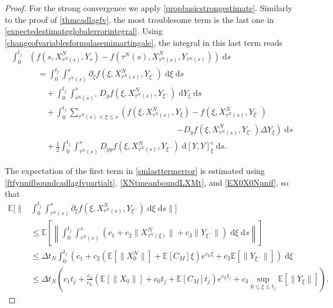 \documentclass[reqno,12pt]{amsart}
\theoremstyle{plain} %
\theoremstyle{definition} %
\begin{document}
\begin{proof}
    For the strong convergence we apply \cref{propbasicstrongestimate}. Similarly to the proof of \cref{thmcadlagfv}, the most troublesome term is the last one in \eqref{expectedestimateglobalerrorintegral}. Using \eqref{changeofvariablesformulasemimartingale}, the integral in this last term reads
    \begin{equation}
        \label{smlasttermerror}
        \begin{aligned}
            \int_0^{t_j} & \left( f(s, X_{\tau^N(s)}^N, Y_s) - f(\tau^N(s), X_{\tau^N(s)}^N, Y_{\tau^N(s)}) \right)\;\mathrm{d}s \\
            & \quad = \int_0^{t_j} \int_{\tau^N(s)}^s \partial_\xi f(\xi, X_{\tau^N(s)}^N, Y_{\xi^-})\;\mathrm{d}\xi \;\mathrm{d}s \\
            & \qquad + \int_0^{t_j} \int_{\tau^N(s)^+}^s D_y f(\xi, X_{\tau^N(s)}^N, Y_{\xi^-}) \;\mathrm{d}Y_\xi \;\mathrm{d}s \\
            & \qquad + \int_0^{t_j} \sum_{\tau^N(s) < \xi \leq s} \left(f(\xi, X_{\tau^N(s)}^N, Y_\xi) - f(\xi, X_{\tau^N(s)}^N, Y_{\xi^{-}}) \right. \\
            & \hspace{3in} \left. - D_y f(\xi, X_{\tau^N(s)}^N, Y_{\xi^-})\Delta Y_\xi\right) \;\mathrm{d}s \\ 
            & \qquad + \frac{1}{2} \int_0^{t_j} \int_{\tau^N(s)}^s D_{yy}f(\xi, X_{\tau^N(s)}^N, Y_{\xi^-})\;\mathrm{d}[Y, Y]_\xi^c\;\mathrm{d}s.
        \end{aligned}
    \end{equation}
    
    The expectation of the first term in \eqref{smlasttermerror} is estimated using \eqref{ftfyunifboundcadlagfvpartialt}, \eqref{XNtmeanboundLXMt}, and \eqref{EX0X0Nunif}, so that
    \begin{align*}
        \mathbb{E}\bigg[\bigg\| & \int_0^{t_j} \int_{\tau^N(s)}^s \partial_\xi f(\xi, X_{\tau^N(s)}^N, Y_{\xi^-})\;\mathrm{d}\xi\;\mathrm{d}s\bigg\|\bigg] \\
        & \leq \mathbb{E}\left[\left\|\int_0^{t_j} \int_{\tau^N(s)}^s \left(c_1 + c_2 \|X_{\tau^N(\xi)}^N\| + c_3\|Y_{\xi^-}\|\right)\;\mathrm{d}\xi\;\mathrm{d}s\right\|\right] \\
        & \leq \Delta t_N\int_0^{t_j} \left(c_1 + c_2  \left(\mathbb{E}\left[\|X_0^N\|\right] + \mathbb{E}[C_M] \xi \right)e^{c_L \xi} + c_3\mathbb{E}\left[\|Y_{\xi^-}\|\right]\right)\;\mathrm{d}\xi \\
        & \leq \Delta t_N \left(c_1 t_j + \frac{c_2}{c_L} \left(\mathbb{E}\left[\|X_0\|\right] + c_0t_j + \mathbb{E}[C_M] t_j \right) e^{c_L t_j} + c_3\sup_{0 \leq \xi \leq t_j}\mathbb{E}\left[\|Y_{\xi}\|\right]\right).
    \end{align*}


\end{proof}
\end{document}
